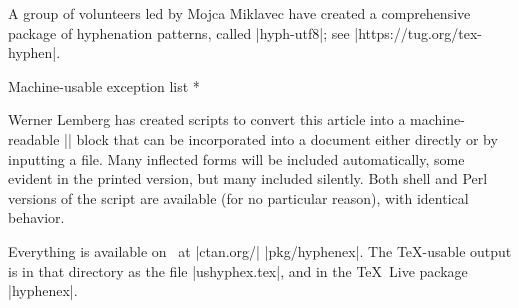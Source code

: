 A group of volunteers led by Mojca Miklavec
have created a comprehensive package of hyphenation patterns, called
|hyph-utf8|; see\newline
|https://tug.org/tex-hyphen|.

\head * Machine-usable exception list *

Werner Lemberg has created scripts to convert this article into a
machine-readable |\hyphenation| block that can be incorporated into a
document either directly or by inputting a file.  Many inflected forms
will be included automatically, some evident in the printed version, but
many included silently.  Both shell and Perl versions of the script are
available (for no particular reason), with identical behavior.

Everything is available on \CTAN\ at
\hbox{|ctan.org/|} |pkg/hyphenex|.
The \TeX-usable output is in that directory as the file
|ushyphex.tex|, and in the \TeX\ Live package |hyphenex|.



\def\printhyphens#1{%
 \setbox0\vbox{%
  \pretolerance-1\hyphenpenalty-10000%
  \hsize0pt\leftskip0pt\rightskip0pt\parfillskip0pt%
  \hbadness100\hfuzz\maxdimen
  \offinterlineskip
  \interlinepenalty0\clubpenalty0\widowpenalty0\brokenpenalty0%
  \noindent\hskip0pt #1\par
  \setbox0\lastbox \global\setbox1\hbox{\hbox{\unhbox0}}%
  \loop \unskip \setbox0\lastbox \ifhbox0%
   \global\setbox1\hbox{\hbox{\unhbox0}\discretionary{}{}{}\unhbox1}%
  \repeat}%
}

%
%
%
%
%

